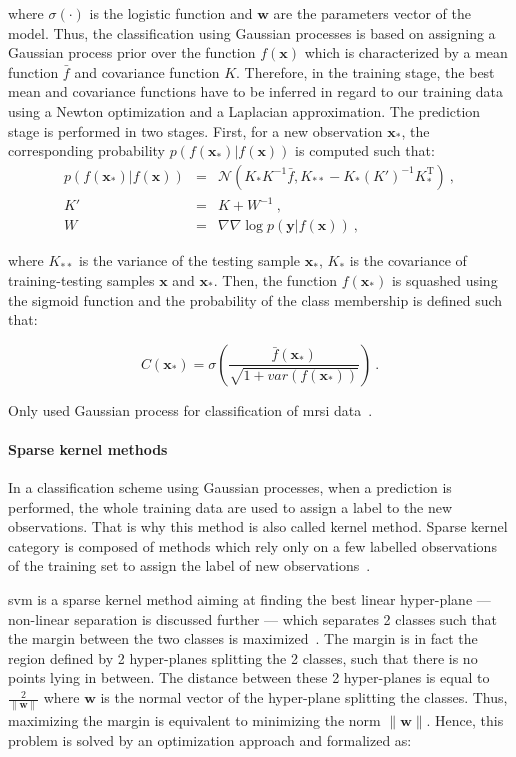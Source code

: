 \noindent where $\sigma(\cdot)$ is the logistic function and $\mathbf{w}$ are the parameters vector of the model.
Thus, the classification using Gaussian processes is based on assigning a Gaussian process prior over the function $f(\mathbf{x})$ which is characterized by a mean function $\bar{f}$ and covariance function $K$.
Therefore, in the training stage, the best mean and covariance functions have to be inferred in regard to our training data using a Newton optimization and a Laplacian approximation.
The prediction stage is performed in two stages.
First, for a new observation $\mathbf{x}_*$, the corresponding probability $p(f(\mathbf{x}_*)|f(\mathbf{x}))$ is computed such that:
\begin{eqnarray}
	p(f(\mathbf{x}_*)|f(\mathbf{x})) & = & \mathcal{N}( K_*K^{-1}\bar{f}, K_{**}-K_*(K')^{-1}K_*^{\text{T}} ) \ , \nonumber \\
	K' & = & K + W^{-1} \ , \label{eq:gp2} \\
	W & = & \nabla \nabla \log p(\mathbf{y}|f(\mathbf{x})) \ , \nonumber
\end{eqnarray}

\noindent where $K_{**}$ is the variance of the testing sample $\mathbf{x}_*$, $K_{*}$ is the covariance of training-testing samples $\mathbf{x}$ and $\mathbf{x}_*$.
Then, the function $f(\mathbf{x}_*)$ is squashed using the sigmoid function and the probability of the class membership is defined such that:

\begin{equation}
	C(\mathbf{x}_*) = \sigma\left( \frac{\bar{f}(\mathbf{x_*})}{\sqrt{1+var(f(\mathbf{x}_*))}} \right) \ .
	\label{eq:gp3}
\end{equation}

Only \citeauthor{Kelm2007} used Gaussian process for classification of \ac{mrsi} data~\cite{Kelm2007}.

\paragraph{Sparse kernel methods}
In a classification scheme using Gaussian processes, when a prediction is performed, the whole training data are used to assign a label to the new observations.
That is why this method is also called kernel method.
Sparse kernel category is composed of methods which rely only on a few labelled observations of the training set to assign the label of new observations~\cite{Bishop2006}.

\Acf{svm} is a sparse kernel method aiming at finding the best linear hyper-plane --- non-linear separation is discussed further --- which separates 2 classes such that the margin between the two classes is maximized~\cite{Vapnik1963}.
The margin is in fact the region defined by 2 hyper-planes splitting the 2 classes, such that there is no points lying in between.
The distance between these 2 hyper-planes is equal to $\frac{2}{\|\mathbf{w}\|}$ where $\mathbf{w}$ is the normal vector of the hyper-plane splitting the classes.
Thus, maximizing the margin is equivalent to minimizing the norm $\|\mathbf{w}\|$.
Hence, this problem is solved by an optimization approach and formalized as:


